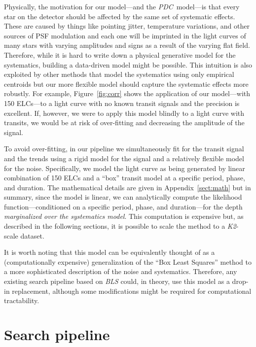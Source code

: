 \documentclass[12pt,preprint]{aastex}
\newcommand{\project}[1]{\textsl{#1}} %
\newcommand{\KT}{\project{K2}}
\newcommand{\pdc}{\project{PDC}}
\newcommand{\figref}[1]{\ref{fig:#1}}
\newcommand{\Fig}[1]{Figure~\figref{#1}}
\newcommand{\App}[1]{Appendix~\ref{sect:#1}}
\newcommand{\app}[1]{\App{#1}}
\begin{document}
Physically, the motivation for our model---and the \pdc\ model---is that every
star on the detector should be affected by the same set of systematic effects.
These are caused by things like pointing jitter, temperature variations, and
other sources of PSF modulation and each one will be imprinted in the light
curves of many stars with varying amplitudes and signs as a result of the
varying flat field.
Therefore, while it is hard to write down a physical generative model for the
systematics, building a data-driven model might be possible.
This intuition is also exploited by other methods that model the systematics
using only empirical centroids \citep{Vanderburg:2014, Aigrain:2015,
Crossfield:2015} but our more flexible model should capture the systematic
effects more robustly.
For example, \Fig{corr} shows the application of our model---with 150
ELCs---to a light curve with no known transit signals and the precision is
excellent.
If, however, we were to apply this model blindly to a light curve with
transits, we would be at risk of over-fitting and decreasing the amplitude of
the signal.

To avoid over-fitting, in our pipeline we simultaneously fit for the transit
signal and the trends using a rigid model for the signal and a relatively
flexible model for the noise.
Specifically, we model the light curve as being generated by linear
combination of 150 ELCs and a ``box'' transit model at a specific period,
phase, and duration.
The mathematical details are given in \app{math} but in summary, since the
model is linear, we can analytically compute the likelihood
function---conditioned on a specific period, phase, and duration---for the
depth \emph{marginalized over the systematics model}.
This computation is expensive but, as described in the following sections, it
is possible to scale the method to a \KT-scale dataset.

It is worth noting that this model can be equivalently thought of as a
(computationally expensive) generalization of the ``Box Least Squares''
\citep[\project{BLS};][]{bls} method to a more sophisticated description of
the noise and systematics.
Therefore, any existing search pipeline based on \project{BLS} could, in
theory, use this model as a drop-in replacement, although some modifications
might be required for computational tractability.


\section{Search pipeline}
\label{sec:search}
\end{document}
